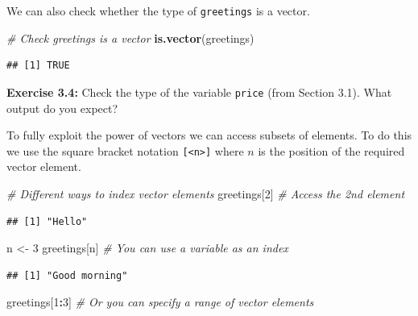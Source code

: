 \documentclass[
]{article}
\newenvironment{Shaded}{\begin{snugshade}}{\end{snugshade}}
\newcommand{\CommentTok}[1]{\textcolor[rgb]{0.56,0.35,0.01}{\textit{#1}}}
\newcommand{\DecValTok}[1]{\textcolor[rgb]{0.00,0.00,0.81}{#1}}
\newcommand{\FunctionTok}[1]{\textcolor[rgb]{0.13,0.29,0.53}{\textbf{#1}}}
\newcommand{\NormalTok}[1]{#1}
\newcommand{\OtherTok}[1]{\textcolor[rgb]{0.56,0.35,0.01}{#1}}
\newcommand{\SpecialCharTok}[1]{\textcolor[rgb]{0.81,0.36,0.00}{\textbf{#1}}}
\begin{document}
We can also check whether the type of \texttt{greetings} is a vector.

\begin{Shaded}
\begin{Highlighting}[]
\CommentTok{\# Check greetings is a vector}
\FunctionTok{is.vector}\NormalTok{(greetings)}
\end{Highlighting}
\end{Shaded}

\begin{verbatim}
## [1] TRUE
\end{verbatim}

\textbf{Exercise 3.4:} Check the type of the variable \texttt{price}
(from Section 3.1). What output do you expect?

To fully exploit the power of vectors we can access subsets of elements.
To do this we use the square bracket notation
\texttt{{[}\textless{}n\textgreater{}{]}} where \(n\) is the position of
the required vector element.

\begin{Shaded}
\begin{Highlighting}[]
\CommentTok{\# Different ways to index vector elements}
\NormalTok{greetings[}\DecValTok{2}\NormalTok{]        }\CommentTok{\# Access the 2nd element}
\end{Highlighting}
\end{Shaded}

\begin{verbatim}
## [1] "Hello"
\end{verbatim}

\begin{Shaded}
\begin{Highlighting}[]
\NormalTok{n }\OtherTok{\textless{}{-}} \DecValTok{3}
\NormalTok{greetings[n]        }\CommentTok{\# You can use a variable as an index }
\end{Highlighting}
\end{Shaded}

\begin{verbatim}
## [1] "Good morning"
\end{verbatim}

\begin{Shaded}
\begin{Highlighting}[]
\NormalTok{greetings[}\DecValTok{1}\SpecialCharTok{:}\DecValTok{3}\NormalTok{]      }\CommentTok{\# Or you can specify a range of vector elements}
\end{Highlighting}
\end{Shaded}
\end{document}
